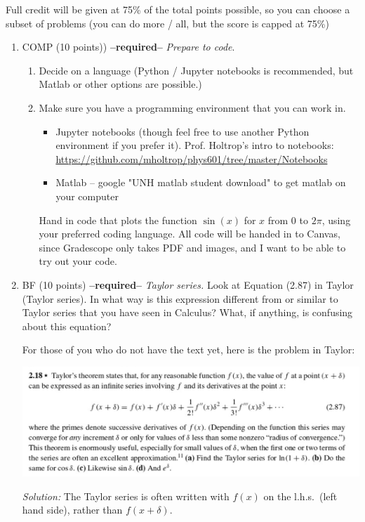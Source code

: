 \documentclass[12pt]{article}
\newcommand{\soln}[1] {\textit{Solution:} #1}
\begin{document}
Full credit will be given at 75\% of the total points possible, so you can choose a subset of problems (you can do more / all, but the score is capped at 75\%)

\begin{enumerate}
  \item COMP (10 points)) \textbf{--required--} \textit{Prepare to code}.
  \begin{enumerate}
    \item Decide on a language (Python / Jupyter notebooks is recommended, but Matlab or other options are possible.)
    \item Make sure you have a programming environment that you can work in.
    \begin{itemize}
      \item Jupyter notebooks (though feel free to use another Python environment if you prefer it). Prof. Holtrop's intro to notebooks: \url{https://github.com/mholtrop/phys601/tree/master/Notebooks}
      \item Matlab -- google "UNH matlab student download" to get matlab on your computer
    \end{itemize}
    Hand in code that plots the function $\sin(x)$ for $x$ from $0$ to $2\pi$, using your preferred coding language. All code will be handed in to Canvas, since Gradescope only takes PDF and images, and I want to be able to try out your code.
  \end{enumerate}

\item BF (10 points) \textbf{--required--} \textit{Taylor series.} Look at Equation (2.87) in Taylor (Taylor series). In what way is this expression different from or similar to Taylor series that you have seen in Calculus? What, if anything, is confusing about this equation?

For those of you who do not have the text yet, here is the problem in Taylor:

\centerline{\includegraphics[width=.7\textwidth]{taylor.png}}

\soln{The Taylor series is often written with $f(x)$ on the l.h.s.\ (left hand side), rather than $f(x+\delta)$.

}
\end{enumerate}
\end{document}
